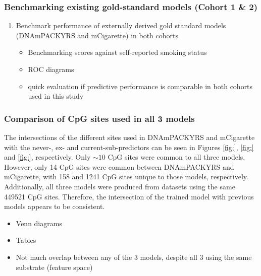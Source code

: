 \documentclass{article}
\begin{document}
\subsubsection{Benchmarking existing gold-standard models (Cohort 1 \& 2)} \label{sec:prior-benchmarks}
\begin{enumerate}
    \item Benchmark performance of externally derived gold standard models (DNAmPACKYRS and mCigarette) in both cohorts
          \begin{itemize}
              \item Benchmarking scores against self-reported smoking status
              \item ROC diagrams
              \item quick evaluation if predictive performance is comparable in both cohorts used in this study
          \end{itemize}
\end{enumerate}

\subsubsection{Comparison of CpG sites used in all 3 models}
The intersections of the different sites used in DNAmPACKYRS and mCigarette with the never-, ex- and current-sub-predictors can be seen in Figures \ref{fig:}, \ref{fig:} and \ref{fig:}, respectively. Only \(\sim \! 10\) CpG sites were common to all three models. However, only 14 CpG sites were common between DNAmPACKYRS and mCigarette, with 158 and 1241 CpG sites unique to those models, respectively. Additionally, all three models were produced from datasets using the same \num{449521} CpG sites. Therefore, the intersection of the trained model with previous models appears to be consistent. 

\begin{itemize}
    \item Venn diagrams
    \item Tables
    \item Not much overlap between any of the 3 models, despite all 3 using the same substrate (feature space)
\end{itemize}
\end{document}
